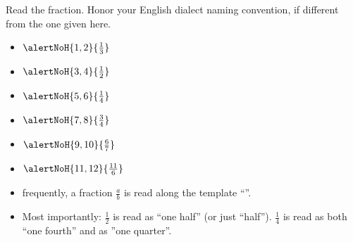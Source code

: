 \begin{frame}
\begin{example}
 {Read the fraction.} Honor your English dialect naming convention, if different from the one given here.
\begin{itemize}
\item $\alertNoH{1,2}{\frac{1}{3}}$ 
\item $\alertNoH{3,4}{\frac{1}{2}}$ 
\item $\alertNoH{5,6}{\frac{1}{4}}$ 
\item $\alertNoH{7,8}{\frac{3}{4}}$ 
\item $\alertNoH{9,10}{\frac{6}{7}}$ 
\item $\alertNoH{11,12}{\frac{11}{6}}$ 

\end{itemize}
\end{example}


\begin{itemize}
\item<13->  frequently, a fraction $\frac{a}{b}$ is read along the template ``''.
\item<15-> Most importantly: $\displaystyle \frac{1}{2}$ is read as ``one half'' (or just ``half''). $\displaystyle \frac{1}{4}$ is read as both ``one fourth'' and as ''one quarter''. 
\end{itemize}

\end{frame}